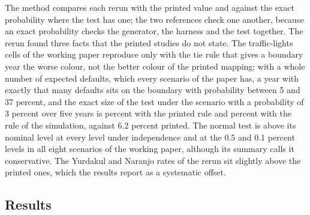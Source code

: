 The method compares each rerun with the printed value and against the exact probability where the test has one; the two references check one another, because an exact probability checks the generator, the harness and the test together. The rerun found three facts that the printed studies do not state. The traffic-lights cells of the working paper reproduce only with the tie rule that gives a boundary year the worse colour, not the better colour
of the printed mapping; with a whole number of expected defaults, which every scenario of the paper has, a year with exactly that many defaults sits on the boundary with probability between 5 and 37 percent, and the exact size of the test under the scenario with a probability of 3 percent over five years is \vtTlLowerExact{} percent with the printed rule and \vtTlUpperExact{} percent with the rule of the simulation, against 6.2 percent printed. The normal test is
above its nominal level at every level under independence and at the 0.5 and 0.1 percent levels in all eight scenarios of the working paper, although its summary calls it conservative. The Yurdakul and Naranjo rates of the rerun sit slightly above the printed ones, which the results report as a systematic offset.

\subsection{Results}
\label{sec:results-validation-tests}

